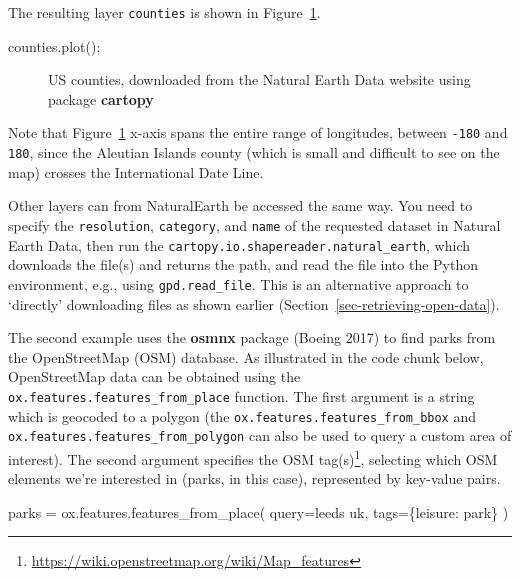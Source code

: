 \documentclass[
  letterpaper,
]{krantz}
\newenvironment{Shaded}{\begin{snugshade}}{\end{snugshade}}
\newcommand{\NormalTok}[1]{\textcolor[rgb]{0.00,0.23,0.31}{#1}}
\newcommand{\OperatorTok}[1]{\textcolor[rgb]{0.37,0.37,0.37}{#1}}
\newcommand{\StringTok}[1]{\textcolor[rgb]{0.13,0.47,0.30}{#1}}
\begin{document}
The resulting layer \texttt{counties} is shown in
Figure~\ref{fig-ne-counties}.

\begin{Shaded}
\begin{Highlighting}[]
\NormalTok{counties.plot()}\OperatorTok{;}
\end{Highlighting}
\end{Shaded}

\begin{figure}[H]


\caption{\label{fig-ne-counties}US counties, downloaded from the Natural
Earth Data website using package \textbf{cartopy}}

\end{figure}%

Note that Figure~\ref{fig-ne-counties} x-axis spans the entire range of
longitudes, between \texttt{-180} and \texttt{180}, since the Aleutian
Islands county (which is small and difficult to see on the map) crosses
the International Date Line.

Other layers can from NaturalEarth be accessed the same way. You need to
specify the \texttt{resolution}, \texttt{category}, and \texttt{name} of
the requested dataset in Natural Earth Data, then run the
\texttt{cartopy.io.shapereader.natural\_earth}, which downloads the
file(s) and returns the path, and read the file into the Python
environment, e.g., using \texttt{gpd.read\_file}. This is an alternative
approach to `directly' downloading files as shown earlier
(Section~\ref{sec-retrieving-open-data}).

The second example uses the \textbf{osmnx} package (Boeing 2017) to find
parks from the OpenStreetMap (OSM) database. As illustrated in the code
chunk below, OpenStreetMap data can be obtained using the
\texttt{ox.features.features\_from\_place} function. The first argument
is a string which is geocoded to a polygon (the
\texttt{ox.features.features\_from\_bbox} and
\texttt{ox.features.features\_from\_polygon} can also be used to query a
custom area of interest). The second argument specifies the OSM
tag(s)\footnote{\url{https://wiki.openstreetmap.org/wiki/Map_features}},
selecting which OSM elements we're interested in (parks, in this case),
represented by key-value pairs.

\begin{Shaded}
\begin{Highlighting}[]
\NormalTok{parks }\OperatorTok{=}\NormalTok{ ox.features.features\_from\_place(}
\NormalTok{    query}\OperatorTok{=}\StringTok{\textquotesingle{}leeds uk\textquotesingle{}}\NormalTok{, }
\NormalTok{    tags}\OperatorTok{=}\NormalTok{\{}\StringTok{\textquotesingle{}leisure\textquotesingle{}}\NormalTok{: }\StringTok{\textquotesingle{}park\textquotesingle{}}\NormalTok{\}}
\NormalTok{)}
\end{Highlighting}
\end{Shaded}
\end{document}
